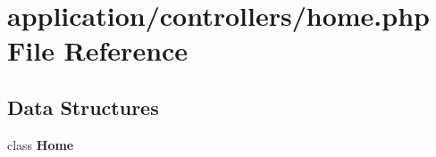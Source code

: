 \section{application/controllers/home.php File Reference}
\label{controllers_2home_8php}
\subsection*{Data Structures}
\begin{DoxyCompactItemize}
\item 
class {\bf Home}
\end{DoxyCompactItemize}
